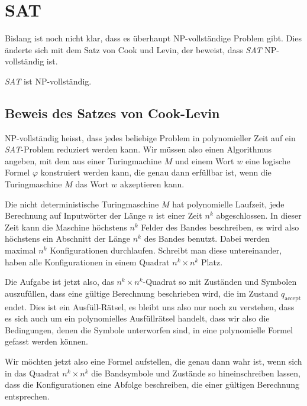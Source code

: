 %
%
%
\section{SAT}
%
%
Bislang ist noch nicht klar, dass es überhaupt NP-vollständige
Problem gibt. Dies änderte sich mit dem Satz von Cook und Levin,
der beweist, dass \textsl{SAT} NP-vollständig ist.

\begin{satz}
\label{cooklevin}
\textsl{SAT} ist NP-vollständig.
\end{satz}




\subsection{Beweis des Satzes von Cook-Levin}

NP-vollständig heisst, dass jedes beliebige Problem in polynomieller
Zeit auf ein \textsl{SAT}-Problem reduziert werden kann.
Wir müssen
also einen Algorithmus angeben, mit dem aus einer Turingmachine
$M$ und einem Wort $w$
eine logische Formel $\varphi$ konstruiert werden kann, die genau
dann erfüllbar ist, wenn die Turingmaschine $M$ das Wort $w$
akzeptieren kann.

Die nicht deterministische Turingmaschine $M$ hat polynomielle Laufzeit,
jede Berechnung auf Inputwörter der Länge $n$ ist einer Zeit $n^k$
abgeschlossen. In dieser Zeit kann die Maschine höchstens $n^k$ Felder
des Bandes beschreiben, es wird also höchstens ein Abschnitt der
Länge $n^k$ des Bandes benutzt. Dabei werden maximal $n^k$
Konfigurationen durchlaufen. Schreibt man diese untereinander,
haben alle Konfigurationen in einem Quadrat $n^k\times n^k$
Platz.

Die Aufgabe ist jetzt also, das $n^k \times n^k$-Quadrat so mit Zuständen
und Symbolen auszufüllen, dass eine gültige Berechnung beschrieben wird,
die im Zustand $q_{\text{accept}}$ endet.
Dies ist ein Ausfüll-Rätsel, es bleibt uns also nur noch zu verstehen,
dass es sich auch um ein polynomielles Ausfüllrätsel handelt,
dass wir also die Bedingungen, denen die Symbole unterworfen sind,
in eine polynomielle Formel gefasst werden können.

Wir möchten jetzt also eine Formel aufstellen, die genau dann wahr
ist, wenn sich in das Quadrat $n^k\times n^k$ die Bandsymbole und
Zustände so hineinschreiben lassen, dass die Konfigurationen eine
Abfolge beschreiben, die einer gültigen Berechnung entsprechen.

